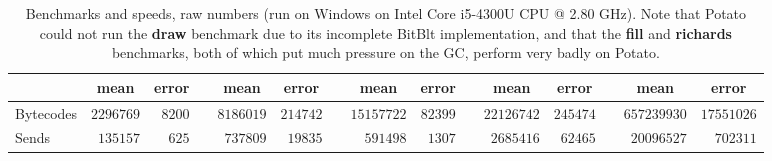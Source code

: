 \documentclass[natbib]{sigplanconf}
\begin{document}
\begin{table}
{\begin{tabular}{lrrcrrcrrcrrcrr}
\cline{2-3} \cline{5-6} \cline{8-9} \cline{11-12} \cline{14-15}
\multicolumn{1}{l}{}&\multicolumn{1}{c}{mean}&\multicolumn{1}{c}{error}&\multicolumn{1}{c}{}&\multicolumn{1}{c}{mean}&\multicolumn{1}{c}{error}&\multicolumn{1}{c}{}&\multicolumn{1}{c}{mean}&\multicolumn{1}{c}{error}&\multicolumn{1}{c}{}&\multicolumn{1}{c}{mean}&\multicolumn{1}{c}{error}&\multicolumn{1}{c}{}&\multicolumn{1}{c}{mean}&\multicolumn{1}{c}{error}\tabularnewline
\midrule
Bytecodes&$2296769$&$8200$&&$8186019$&$214742$&&$15157722$&$82399$&&$22126742$&$245474$&&$657239930$&$17551026$\tabularnewline
Sends&$ 135157$&$ 625$&&$ 737809$&$ 19835$&&$  591498$&$ 1307$&&$ 2685416$&$ 62465$&&$ 20096527$&$  702311$\tabularnewline
\bottomrule
\end{tabular}}

  \caption{Benchmarks and speeds, raw numbers (run on Windows on Intel
    Core i5-4300U CPU @ 2.80 GHz). Note that Potato could not run the
    \textbf{draw} benchmark due to its incomplete BitBlt
    implementation, and that the \textbf{fill} and \textbf{richards}
    benchmarks, both of which put much pressure on the GC, perform
    very badly on Potato.}
  \label{tab:win}
\end{table}

\endgroup
\end{document}
